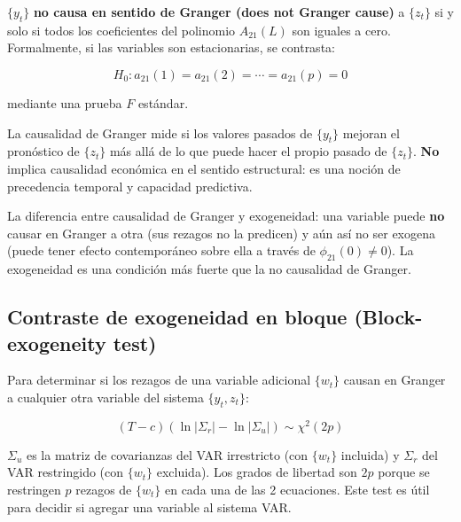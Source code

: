 \documentclass[12pt]{article}
\begin{document}
$\{y_t\}$ \textbf{no causa en sentido de Granger (does not Granger cause)} a $\{z_t\}$ si y solo si todos los coeficientes del polinomio $A_{21}(L)$ son iguales a cero. Formalmente, si las variables son estacionarias, se contrasta:

\begin{equation}
H_0: a_{21}(1) = a_{21}(2) = \cdots = a_{21}(p) = 0
\end{equation}

mediante una prueba $F$ est\'andar.

\begin{intuicionmat}
La causalidad de Granger mide si los valores pasados de $\{y_t\}$ mejoran el pron\'ostico de $\{z_t\}$ m\'as all\'a de lo que puede hacer el propio pasado de $\{z_t\}$. \textbf{No} implica causalidad econ\'omica en el sentido estructural: es una noci\'on de precedencia temporal y capacidad predictiva.
\end{intuicionmat}

\begin{intuicion}
La diferencia entre causalidad de Granger y exogeneidad: una variable puede \textbf{no} causar en Granger a otra (sus rezagos no la predicen) y a\'un as\'i no ser exogena (puede tener efecto contempor\'aneo sobre ella a trav\'es de $\phi_{21}(0) \neq 0$). La exogeneidad es una condici\'on m\'as fuerte que la no causalidad de Granger.
\end{intuicion}

\subsection{Contraste de exogeneidad en bloque (Block-exogeneity test)}

Para determinar si los rezagos de una variable adicional $\{w_t\}$ causan en Granger a cualquier otra variable del sistema $\{y_t, z_t\}$:

\begin{equation}
(T - c)\left(\ln|\Sigma_r| - \ln|\Sigma_u|\right) \sim \chi^2(2p)
\end{equation}

\begin{intuicionmat}
$\Sigma_u$ es la matriz de covarianzas del VAR irrestricto (con $\{w_t\}$ incluida) y $\Sigma_r$ del VAR restringido (con $\{w_t\}$ excluida). Los grados de libertad son $2p$ porque se restringen $p$ rezagos de $\{w_t\}$ en cada una de las 2 ecuaciones. Este test es \'util para decidir si agregar una variable al sistema VAR.
\end{intuicionmat}
\end{document}

